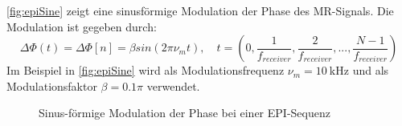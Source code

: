 \autoref{fig:epiSine} zeigt eine sinusförmige Modulation der Phase des MR-Signals. Die Modulation ist gegeben durch:
\begin{equation}
	\Delta \Phi(t)=\Delta \Phi[n]= \beta sin(2 \pi \nu_m t), \quad t=(0,\frac{1}{f_{receiver}},\frac{2}{f_{receiver}},...,\frac{N-1}{f_{receiver}})
\end{equation}
Im Beispiel in \autoref{fig:epiSine} wird als Modulationsfrequenz $\nu_m=\SI{10}{\kilo\hertz}$ und als Modulationsfaktor $\beta=0.1 \pi$ verwendet.

\begin{figure}[H]
	\centering
	\hfill
	
	\caption{Sinus-förmige Modulation der Phase bei einer EPI-Sequenz}
	\label{fig:epiSine}	
\end{figure}














